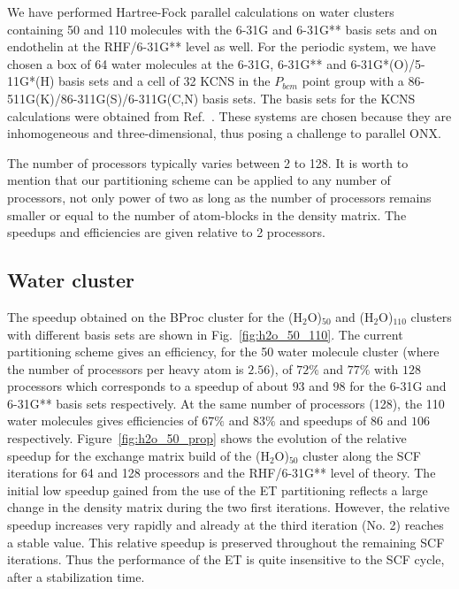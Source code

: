 \documentclass[prl,twocolumn,twocolumngrid,superbib]{revtex4}
\begin{document}
 We have performed Hartree-Fock parallel calculations on 
 water clusters containing 50 and 110 molecules with 
 the 6-31G and 6-31G** basis sets and on endothelin at the RHF/6-31G** level as well.
 For the periodic system, we have chosen a box of 64 water molecules
 at the 6-31G, 6-31G** and 6-31G*(O)/5-11G*(H) basis sets
 and a cell of 32 KCNS in the $P_{bcm}$ point group with
 a 86-511G(K)/86-311G(S)/6-311G(C,N) basis sets.
 The basis sets for the KCNS calculations were obtained from 
 Ref.~\cite{CrystalLib}.
 These systems are chosen because
 they are inhomogeneous and three-dimensional, thus posing a challenge
 to parallel ONX.

 The number of processors typically varies between 2 to 128. 
 It is worth to mention that our partitioning scheme can be 
 applied to any number of processors, not only power of two 
 as long as the number of processors remains smaller or equal 
 to the number of atom-blocks in the density matrix.
 The speedups and efficiencies are given relative to 2 processors.

\subsection{Water cluster}

 The speedup obtained on the BProc cluster for the (H$_2$O)$_{50}$ 
 and (H$_2$O)$_{110}$ clusters 
 with different basis sets are shown in Fig.~\ref{fig:h2o_50_110}. 
 The current partitioning scheme
 gives an efficiency, for the 50 water molecule cluster 
 (where the number of processors per heavy atom is $2.56$), 
 of $72\%$ and $77\%$ with $128$ processors which 
 corresponds to a speedup of about $93$ and $98$ for 
 the 6-31G and 6-31G** basis sets respectively.  
 At the same number of processors (128), the 110 water molecules gives efficiencies of
 $67\%$ and $83\%$ and speedups of $86$ and $106$ respectively.
 Figure~\ref{fig:h2o_50_prop} shows the evolution of the relative speedup for
 the exchange matrix build of
 the (H$_2$O)$_{50}$ cluster along the SCF iterations for 
 64 and 128 processors and the RHF/6-31G** level of theory. 
 The initial low speedup gained from the use of the ET partitioning  
 reflects a large change in the density matrix during the two first 
 iterations. However, the relative speedup increases very 
 rapidly and already at the third iteration (No. 2) reaches a stable value.
 This relative speedup is preserved throughout the remaining SCF iterations.
 Thus the performance of the ET is quite insensitive to the SCF cycle, after
 a stabilization time.
\end{document}
